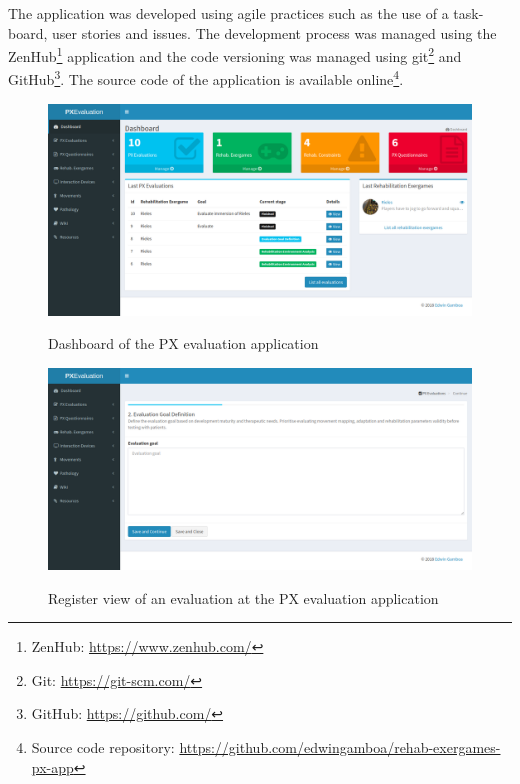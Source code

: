 The application was developed using agile practices such as the use of a task-board, user stories and issues. The development process was managed using the ZenHub\footnote{ZenHub: \url{https://www.zenhub.com/}} application and the code versioning was managed using git\footnote{Git: \url{https://git-scm.com/}} and GitHub\footnote{GitHub: \url{https://github.com/}}. The source code of the application is available online\footnote{Source code repository: \url{https://github.com/edwingamboa/rehab-exergames-px-app}}.

\begin{figure}[bth]
\myfloatalign
{\includegraphics[width=\linewidth]{gfx/app/dashboardApp}} \quad
\caption{Dashboard of the \ac{PX} evaluation application}\label{fig:dashboardApp}
\end{figure}

\begin{figure}[bth]
\myfloatalign
{\includegraphics[width=\linewidth]{gfx/app/evaluationApp1}} \quad
\caption{Register view of an evaluation at the \ac{PX} evaluation application}\label{fig:evaluationApp1}
\end{figure}


